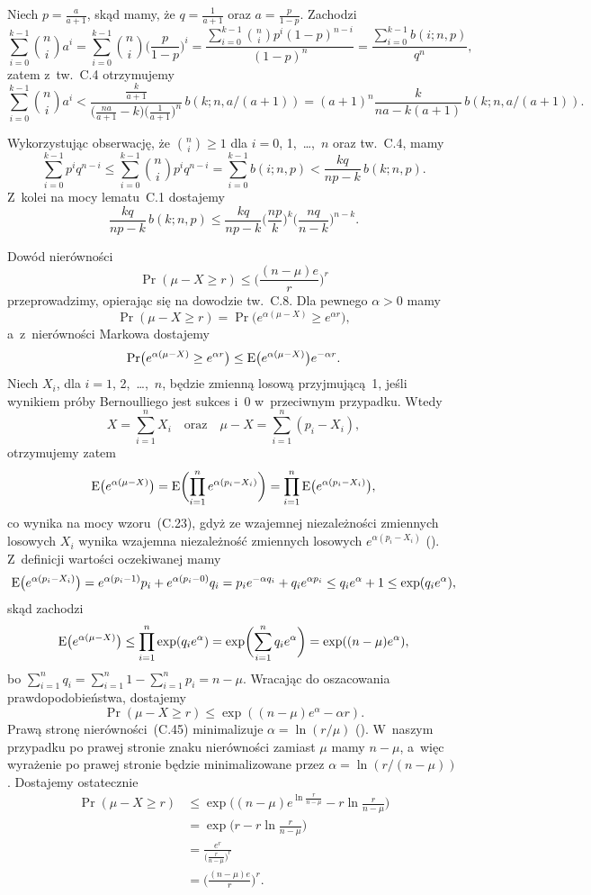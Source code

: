 \noindent Niech $p=\frac{a}{a+1}$, skąd mamy, że $q=\frac{1}{a+1}$ oraz $a=\frac{p}{1-p}$. Zachodzi
\[
	\sum_{i=0}^{k-1}\binom{n}{i}a^i = \sum_{i=0}^{k-1}\binom{n}{i}\biggl(\frac{p}{1-p}\biggr)^i = \frac{\sum_{i=0}^{k-1}\binom{n}{i}p^i(1-p)^{n-i}}{(1-p)^n} = \frac{\sum_{i=0}^{k-1}b(i;n,p)}{q^n},
\]
zatem z~tw.~C.4 otrzymujemy
\[
	\sum_{i=0}^{k-1}\binom{n}{i}a^i < \frac{\frac{k}{a+1}}{\bigl(\frac{na}{a+1}-k\bigr)\bigl(\frac{1}{a+1}\bigr)^n}\,b(k;n,a/(a+1)) = (a+1)^n\frac{k}{na-k(a+1)}\,b(k;n,a/(a+1)).
\]

\exercise %
Wykorzystując obserwację, że $\binom{n}{i}\ge1$ dla $i=0$, 1,~\dots,~$n$ oraz tw.~C.4, mamy
\[
	\sum_{i=0}^{k-1}p^iq^{n-i} \le \sum_{i=0}^{k-1}\binom{n}{i}p^iq^{n-i} = \sum_{i=0}^{k-1}b(i;n,p) < \frac{kq}{np-k}\,b(k;n,p).
\]
Z~kolei na mocy lematu~C.1 dostajemy
\[
	\frac{kq}{np-k}\,b(k;n,p) \le \frac{kq}{np-k}\biggl(\frac{np}{k}\biggr)^k\biggl(\frac{nq}{n-k}\biggr)^{n-k}.
\]

\exercise %
Dowód nierówności
\[
    \Pr(\mu-X\ge r) \le \biggl(\frac{(n-\mu)e}{r}\biggr)^r
\]
przeprowadzimy, opierając się na dowodzie tw.~C.8. Dla pewnego $\alpha>0$ mamy
\[
	\Pr(\mu-X\ge r) = \Pr\bigl(e^{\alpha(\mu-X)}\ge e^{\alpha r}\bigr),
\]
a~z~nierówności Markowa dostajemy
\[
	\Pr\bigl(e^{\alpha(\mu-X)}\ge e^{\alpha r}\bigr) \le \operatorname{E}\bigl(e^{\alpha(\mu-X)}\bigr)e^{-\alpha r}.
\]
Niech $X_i$, dla $i=1$, 2,~\dots,~$n$, będzie zmienną losową przyjmującą~1, jeśli wynikiem  próby Bernoulliego jest sukces i~0 w~przeciwnym przypadku. Wtedy
\[
	X = \sum_{i=1}^nX_i \quad\text{oraz}\quad \mu-X = \sum_{i=1}^n(p_i-X_i),
\]
otrzymujemy zatem
\[
	\operatorname{E}\bigl(e^{\alpha(\mu-X)}\bigr) = \operatorname{E}\biggl(\prod_{i=1}^ne^{\alpha(p_i-X_i)}\biggr) = \prod_{i=1}^n\operatorname{E}\bigl(e^{\alpha(p_i-X_i)}\bigr),
\]
co wynika na mocy wzoru~(C.23), gdyż ze wzajemnej niezależności zmiennych losowych $X_i$ wynika wzajemna niezależność zmiennych losowych $e^{\alpha(p_i-X_i)}$ (). Z~definicji wartości oczekiwanej mamy
\[
	\operatorname{E}\bigl(e^{\alpha(p_i-X_i)}\bigr) = e^{\alpha(p_i-1)}p_i+e^{\alpha(p_i-0)}q_i = p_ie^{-\alpha q_i}+q_ie^{\alpha p_i} \le q_ie^{\alpha}+1 \le \exp(q_ie^\alpha),
\]
skąd zachodzi
\[
	\operatorname{E}\bigl(e^{\alpha(\mu-X)}\bigr) \le \prod_{i=1}^n\exp(q_ie^\alpha) = \exp\biggl(\sum_{i=1}^nq_ie^\alpha\biggr) = \exp((n-\mu)e^\alpha),
\]
bo $\sum_{i=1}^nq_i=\sum_{i=1}^n1-\sum_{i=1}^np_i=n-\mu$. Wracając do oszacowania prawdopodobieństwa, dostajemy
\[
	\Pr(\mu-X\ge r) \le \exp((n-\mu)e^\alpha-\alpha r).
\]
Prawą stronę nierówności~(C.45) minimalizuje $\alpha=\ln(r/\mu)$ (). W~naszym przypadku po prawej stronie znaku nierówności zamiast $\mu$ mamy $n-\mu$, a~więc wyrażenie po prawej stronie będzie minimalizowane przez $\alpha=\ln(r/(n-\mu))$. Dostajemy ostatecznie
\begin{align*}
	\Pr(\mu-X\ge r) &\le \exp\biggl((n-\mu)e^{\ln\frac{r}{n-\mu}}-r\ln\frac{r}{n-\mu}\biggr) \\
	&= \exp\biggl(r-r\ln\frac{r}{n-\mu}\biggr) \\
	&= \frac{e^r}{\bigl(\frac{r}{n-\mu}\bigr)^r} \\
	&= \biggl(\frac{(n-\mu)e}{r}\biggr)^r.
\end{align*}

